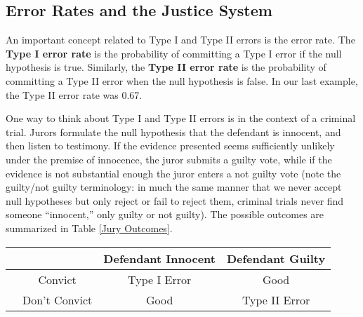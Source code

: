 \subsection{Error Rates and the Justice System}

An important concept related to Type I and Type II errors is the error rate.  The \textbf{Type I error rate}  is the probability of committing a Type I error if the null hypothesis is true.  Similarly, the \textbf{Type II error rate}  is the probability of committing a Type II error when the null hypothesis is false.  In our last example, the Type II error rate was 0.67.

One way to think about Type I and Type II errors is in the context of a criminal trial. Jurors formulate the null hypothesis that the defendant is innocent, and then listen to testimony. If the evidence presented seems sufficiently unlikely under the premise of innocence, the juror submits a guilty vote, while if the evidence is not substantial enough the juror enters a not guilty vote (note the guilty/not guilty terminology: in much the same manner that we never accept null hypotheses but only reject or fail to reject them, criminal trials never find someone ``innocent,'' only guilty or not guilty). The possible outcomes are summarized in Table \ref{Jury Outcomes}.

\begin{table*}[h!]
	\centering
		\begin{tabular}{|c||c|c|}
				\hline
							\textbf{ } & \textbf{Defendant Innocent} & \textbf{Defendant Guilty}\\
								     \hline \hline
\ \ Convict & Type I Error & Good\\
\hline
\ \ Don't Convict & Good & Type II Error\\
\hline
				\end{tabular}
				\caption{The possible outcomes of a criminal trial.  The null hypothesis is that the defendant is innocent; had it been that he is guilty, the Type I and Type II errors would be flipped.}
				\label{Jury Outcomes}
\end{table*}

